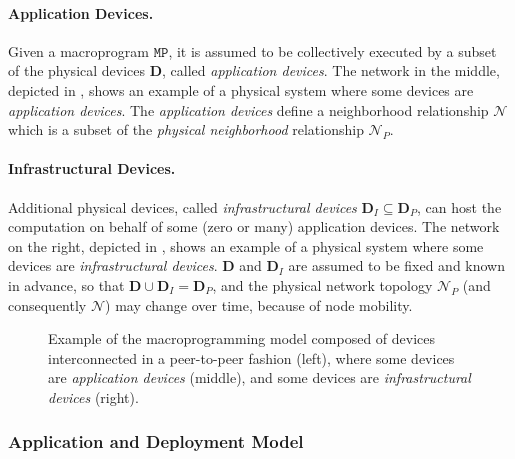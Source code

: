 \paragraph{Application Devices.}
Given a macroprogram $\mathtt{MP}$,
 it is assumed to be collectively executed by a subset of the physical devices $\mathbf{D}$,
 called \emph{application devices}.
%
The network in the middle, depicted in , 
 shows an example of a physical system where some devices are \emph{application devices}.
%
The \emph{application devices} define a neighborhood relationship $\mathcal{N}$ 
 which is a subset of the \emph{physical neighborhood} relationship $\mathcal{N}_P$.

\paragraph{Infrastructural Devices.}
Additional physical devices, called \emph{infrastructural devices} $\mathbf{D}_I \subseteq \mathbf{D}_P$,
can host the computation on behalf of some (zero or many) application devices.
%
The network on the right, depicted in , 
 shows an example of a physical system where some devices are \emph{infrastructural devices}.
%
$\mathbf{D}$ and $\mathbf{D}_I$ are assumed to be fixed and known in advance,
 so that $\mathbf{D} \cup \mathbf{D}_I = \mathbf{D}_P$,
 and the physical network topology $\mathcal{N}_P$ (and consequently $\mathcal{N}$) may change over time,
 because of node mobility.

\begin{figure}
  \centering
  \resizebox{\linewidth}{!}{%
  }
  \caption{
    Example of the macroprogramming model composed of devices interconnected
    in a peer-to-peer fashion (left), where some devices are
    \emph{application devices} (middle), and some devices are
    \emph{infrastructural devices} (right).
  }
  \label{fig:pulverization-model-all}
\end{figure}

\subsubsection{Application and Deployment Model}\label{sec:deployment-model}

